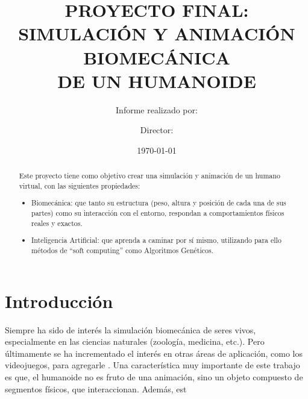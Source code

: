 \documentclass{article}
\title{PROYECTO FINAL: \\ SIMULACI\'ON Y ANIMACI\'ON BIOMEC\'ANICA \\DE UN HUMANOIDE } %
\author{Informe realizado por: }
\affil{Altamiranda Graterol, Enzo\\%
\url{ealtamir@itba.edu.ar}}
\affil{Fontanella De Santis, Teresa\\
\url{tfontane@itba.edu.ar}}
\affil{Mehdi, Tom\'as\\
\url{tmehdi@itba.edu.ar}}
\author{Director:}
\affil{ Dr. PARISI, Daniel Ricardo}
\date{\today} %
\begin{document}

\maketitle %
\thispagestyle{empty} %

\newpage
\tableofcontents
\newpage

 \begin{abstract}
 
\noindent

\begin{adjustwidth}{1.05cm}{0cm}
Este proyecto tiene como objetivo crear una simulaci\'on y animaci\'on de un humano virtual, con las siguientes propiedades:
\begin{itemize}[leftmargin=5.5mm]
\item Biomec\'anica: que tanto su estructura (peso, altura y posici\'on de cada una de sus partes) como su interacci\'on con el entorno, respondan a comportamientos f\'isicos reales y exactos.
\item Inteligencia Artificial: que aprenda a caminar por s\'i mismo, utilizando para ello m\'etodos de ``soft computing'' como Algoritmos Gen\'eticos.
\end{itemize}

\end{adjustwidth}

 \end{abstract}



\section{Introducci\'on}

\begin{adjustwidth}{1cm}{0cm}
Siempre ha sido de inter\'es la simulaci\'on biomec\'anica de seres vivos, especialmente en las ciencias naturales (zoolog\'ia, medicina, etc.). Pero \'ultimamente se ha incrementado el inter\'es en otras \'areas de aplicaci\'on, como los videojuegos, para agregarle  .
Una caracter\'istica muy importante de este trabajo es que, el humanoide no es fruto de una animaci\'on, sino  un objeto compuesto de segmentos f\'isicos, que interaccionan. Adem\'as, est  
\end{adjustwidth}
\end{document}
